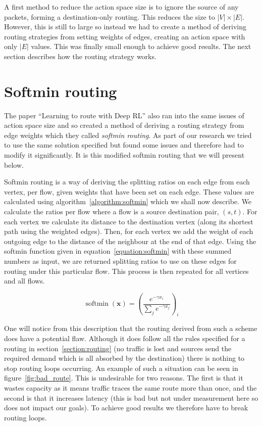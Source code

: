 A first method to reduce the action space size is to ignore the source of any packets, forming a destination-only routing. This reduces the size to $|V|\times|E|$. However, this is still to large so instead we had to create a method of deriving routing strategies from setting weights of edges, creating an action space with only $|E|$ values. This was finally small enough to achieve good results. The next section describes how the routing strategy works.

\section{Softmin routing}
The paper ``Learning to route with Deep RL'' also ran into the same issues of action space size and so created a method of deriving a routing strategy from edge weights which they called \emph{softmin routing}. As part of our research we tried to use the same solution specified but found some issues and therefore had to modify it significantly. It is this modified softmin routing that we will present below.

Softmin routing is a way of deriving the splitting ratios on each edge from each vertex, per flow, given weights that have been set on each edge. These values are calculated using algorithm~\ref{algorithm:softmin} which we shall now describe. We calculate the ratios per flow where a flow is a source destination pair, $(s,t)$. For each vertex we calculate its distance to the destination vertex (along its shortest path using the weighted edges). Then, for each vertex we add the weight of each outgoing edge to the distance of the neighbour at the end of that edge. Using the softmin function given in equation~\ref{equation:softmin} with these summed numbers as input, we are returned splitting ratios to use on these edges for routing under this particular flow. This process is then repeated for all vertices and all flows.

\begin{equation}
  \label{equation:softmin}
  \operatorname{softmin}(\bm{x}) = \left(\frac{e^{-\gamma x_i}}{\sum_{j}{e^{-\gamma x_j}}}\right)_i
\end{equation}

One will notice from this description that the routing derived from such a scheme does have a potential flaw. Although it does follow all the rules specified for a routing in section~\ref{section:routing} (no traffic is lost and sources send the required demand which is all absorbed by the destination) there is nothing to stop routing loops occurring. An example of such a situation can be seen in figure~\ref{fig:bad_route}. This is undesirable for two reasons. The first is that it wastes capacity as it means traffic traces the same route more than once, and the second is that it increases latency (this is bad but not under measurement here so does not impact our goals). To achieve good results we therefore have to break routing loops.

